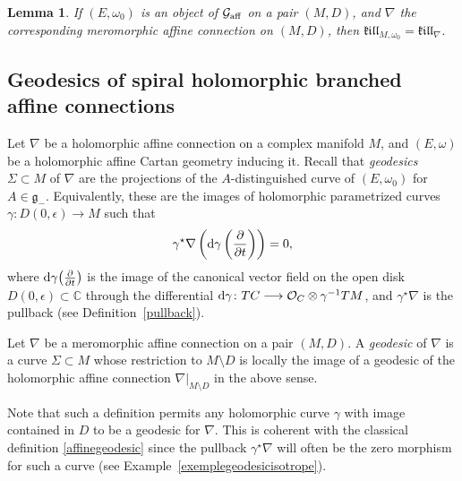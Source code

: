 \documentclass[10pt,a4paper]{amsart}
\newcommand{\der}[2]{\frac{\partial #1}{\partial#2}}
\numberwithin{equation}{section}
\newtheorem{Lemma}[Theorem]{Lemma}
\begin{document}
\begin{Lemma}If $(E,\omega_0)$ is an object of $\mathcal{G}_{\rm aff}$ on a pair $(M,D)$, and $\nabla$ the corresponding meromorphic affine connection on $(M,D)$, then $\mathfrak{k}\mathfrak{i}\mathfrak{l}\mathfrak{l}_{M,\omega_0}=\mathfrak{k}\mathfrak{i}\mathfrak{l}\mathfrak{l}_{\nabla}$. \end{Lemma}

\subsection{Geodesics of spiral holomorphic branched affine connections}

Let $\nabla$ be a holomorphic affine connection on a complex manifold $M$, and $(E,\omega)$ be a holomorphic affine Cartan geometry inducing it. Recall that \textit{geodesics} $\Sigma\subset M$ of $\nabla$ are the projections of the $A$-distinguished curve of $(E,\omega_0)$ for $A\in \mathfrak{g}_-$. Equivalently, these are the images of holomorphic parametrized curves $\gamma\colon D(0,\epsilon) \longrightarrow M$ such that
\begin{gather}\label{affinegeodesic} \gamma^\star \nabla \left({\rm d}\gamma\left(\der{}{t}\right)\right) = 0, \end{gather}
where ${\rm d}\gamma\big(\der{}{t}\big)$ is the image of the canonical vector field on the open disk $D(0,\epsilon) \subset \mathbb{C}$ through the differential ${\rm d}\gamma \colon TC \longrightarrow \mathcal{O}_C\otimes \gamma^{-1}TM$, and $\gamma^\star \nabla$ is the pullback (see Definition~\ref{pullback}).
\begin{Definition}\label{meromorphicgeodesics}Let $\nabla$ be a meromorphic affine connection on a pair $(M,D)$. A \textit{geodesic} of $\nabla$ is a curve $\Sigma \subset M$ whose restriction to $M\setminus D$ is locally the image of a geodesic of the holomorphic affine connection $\nabla\vert_{M\setminus D}$ in the above sense.
 \end{Definition}

Note that such a definition permits any holomorphic curve $\gamma$ with image contained in $D$ to be a geodesic for $\nabla$. This is coherent with the classical definition \eqref{affinegeodesic} since the pullback $\gamma^\star \nabla$ will often be the zero morphism for such a curve (see Example~\ref{exemplegeodesicisotrope}).
\end{document}
